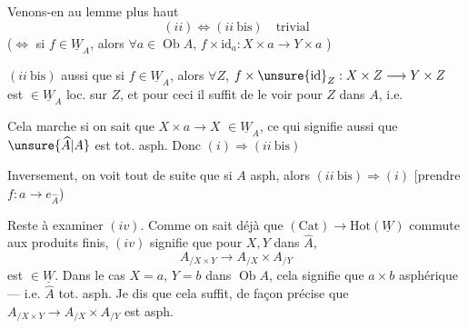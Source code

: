 Venons-en au lemme plus haut
\[
(ii)\Longleftrightarrow(ii\ \mathrm{bis})\quad\text{trivial}
\]
($\Longleftrightarrow$ si $f\in\underline W_A$, alors $\forall a\in\operatorname{Ob}A$, $f\times\mathrm{id}_a:X\times a\longrightarrow Y\times a$ )


$(ii\ \mathrm{bis})$  aussi que si $f\in\underline W_A$, alors $\forall Z$, $f\times\unsure{\mathrm{id}}_Z:X\times Z\longrightarrow Y\times Z$ est $\in\underline W_A$ loc. sur $Z$, et pour ceci il suffit de le voir pour $Z$ dans $A$, i.e.

Cela marche si on sait que $X\times a\longrightarrow X$  $\in\underline W_A$, ce qui signifie aussi que $\unsure{\widehat A|A}$ est tot. asph.  Donc $(i)\Longrightarrow(ii\ \mathrm{bis})$

 Inversement, on voit tout de suite que si $A$ asph, alors $(ii\ \mathrm{bis})\Longrightarrow(i)$ [prendre $f:a\longrightarrow e_{\widehat A}$)

Reste à examiner $(iv)$. Comme on sait déjà que $(\mathrm{Cat})\longrightarrow\mathrm{Hot}(\underline W)$ commute aux produits finis, $(iv)$ signifie que pour $X,Y$ dans $\widehat A$,
\[
A_{/X\times Y}\longrightarrow A_{/X}\times A_{/Y}
\]
est $\in\underline W$.  Dans le cas $X=a$, $Y=b$ dans $\operatorname{Ob}A$, cela signifie que $a\times b$ asphérique --- i.e. $\widehat A$ tot. asph. Je dis que cela suffit, de façon précise que $A_{/X\times Y}\longrightarrow A_{/X}\times A_{/Y}$ est asph.

